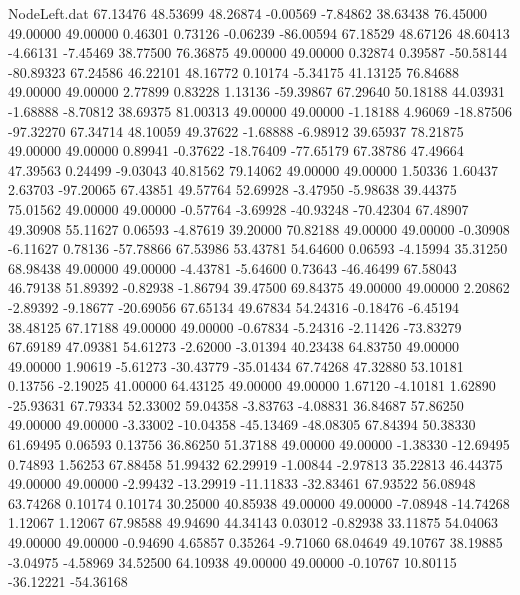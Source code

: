 \begin{filecontents}{NodeLeft.dat}
  67.13476   48.53699   48.26874    -0.00569   -7.84862   38.63438   76.45000   49.00000   49.00000    0.46301    0.73126   -0.06239  -86.00594
  67.18529   48.67126   48.60413    -4.66131   -7.45469   38.77500   76.36875   49.00000   49.00000    0.32874    0.39587  -50.58144  -80.89323
  67.24586   46.22101   48.16772     0.10174   -5.34175   41.13125   76.84688   49.00000   49.00000    2.77899    0.83228    1.13136  -59.39867
  67.29640   50.18188   44.03931    -1.68888   -8.70812   38.69375   81.00313   49.00000   49.00000   -1.18188    4.96069  -18.87506  -97.32270
  67.34714   48.10059   49.37622    -1.68888   -6.98912   39.65937   78.21875   49.00000   49.00000    0.89941   -0.37622  -18.76409  -77.65179
  67.38786   47.49664   47.39563     0.24499   -9.03043   40.81562   79.14062   49.00000   49.00000    1.50336    1.60437    2.63703  -97.20065
  67.43851   49.57764   52.69928    -3.47950   -5.98638   39.44375   75.01562   49.00000   49.00000   -0.57764   -3.69928  -40.93248  -70.42304
  67.48907   49.30908   55.11627     0.06593   -4.87619   39.20000   70.82188   49.00000   49.00000   -0.30908   -6.11627    0.78136  -57.78866
  67.53986   53.43781   54.64600     0.06593   -4.15994   35.31250   68.98438   49.00000   49.00000   -4.43781   -5.64600    0.73643  -46.46499
  67.58043   46.79138   51.89392    -0.82938   -1.86794   39.47500   69.84375   49.00000   49.00000    2.20862   -2.89392   -9.18677  -20.69056
  67.65134   49.67834   54.24316    -0.18476   -6.45194   38.48125   67.17188   49.00000   49.00000   -0.67834   -5.24316   -2.11426  -73.83279
  67.69189   47.09381   54.61273    -2.62000   -3.01394   40.23438   64.83750   49.00000   49.00000    1.90619   -5.61273  -30.43779  -35.01434
  67.74268   47.32880   53.10181     0.13756   -2.19025   41.00000   64.43125   49.00000   49.00000    1.67120   -4.10181    1.62890  -25.93631
  67.79334   52.33002   59.04358    -3.83763   -4.08831   36.84687   57.86250   49.00000   49.00000   -3.33002  -10.04358  -45.13469  -48.08305
  67.84394   50.38330   61.69495     0.06593    0.13756   36.86250   51.37188   49.00000   49.00000   -1.38330  -12.69495    0.74893    1.56253
  67.88458   51.99432   62.29919    -1.00844   -2.97813   35.22813   46.44375   49.00000   49.00000   -2.99432  -13.29919  -11.11833  -32.83461
  67.93522   56.08948   63.74268     0.10174    0.10174   30.25000   40.85938   49.00000   49.00000   -7.08948  -14.74268    1.12067    1.12067
  67.98588   49.94690   44.34143     0.03012   -0.82938   33.11875   54.04063   49.00000   49.00000   -0.94690    4.65857    0.35264   -9.71060
  68.04649   49.10767   38.19885    -3.04975   -4.58969   34.52500   64.10938   49.00000   49.00000   -0.10767   10.80115  -36.12221  -54.36168

\end{filecontents}
